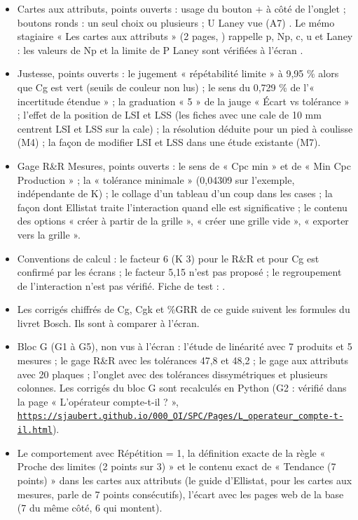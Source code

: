\documentclass[10pt,a4paper]{article}
\begin{document}
\begin{tcolorbox}[verif]
\begin{itemize}
\item Cartes aux attributs, points ouverts : usage du bouton + à côté de l'onglet ; boutons ronds : un seul choix ou plusieurs ; U Laney vue (A7) . Le mémo stagiaire « Les cartes aux attributs » (2 pages, ) rappelle p, Np, c, u et Laney : les valeurs de Np et la limite de P Laney sont vérifiées à l'écran .
\item Justesse, points ouverts : le jugement « répétabilité limite » à 9,95 \% alors que Cg est vert (seuils de couleur non lus) ; le sens du 0,729 \% de l'« incertitude étendue » ; la graduation « 5 » de la jauge « Écart vs tolérance » ; l'effet de la position de LSI et LSS (les fiches avec une cale de 10 mm centrent LSI et LSS sur la cale) ; la résolution déduite pour un pied à coulisse (M4) ; la façon de modifier LSI et LSS dans une étude existante (M7).
\item Gage R\&R Mesures, points ouverts : le sens de « Cpc min » et de « Min Cpc Production » ; la « tolérance minimale » (0,04309 sur l'exemple, indépendante de K) ; le collage d'un tableau d'un coup dans les cases ; la façon dont Ellistat traite l'interaction quand elle est significative ; le contenu des options « créer à partir de la grille », « créer une grille vide », « exporter vers la grille ».
\item Conventions de calcul : le facteur 6 (K 3) pour le R\&R et pour Cg est confirmé par les écrans ; le facteur 5,15 n'est pas proposé ; le regroupement de l'interaction n'est pas vérifié. Fiche de test : .
\item Les corrigés chiffrés de Cg, Cgk et \%GRR de ce guide suivent les formules du livret Bosch. Ils sont à comparer à l'écran.
\item Bloc G (G1 à G5), non vus à l'écran : l'étude de linéarité avec 7 produits et 5 mesures ; le gage R\&R avec les tolérances 47,8 et 48,2 ; le gage aux attributs avec 20 plaques ; l'onglet  avec des tolérances dissymétriques et plusieurs colonnes. Les corrigés du bloc G sont recalculés en Python (G2 : vérifié dans la page « L'opérateur compte-t-il ? », \href{https://sjaubert.github.io/000_OI/SPC/Pages/L_operateur_compte-t-il.html}{\nolinkurl{https://sjaubert.github.io/000_OI/SPC/Pages/L_operateur_compte-t-il.html}}).
\item Le comportement avec Répétition = 1, la définition exacte de la règle « Proche des limites (2 points sur 3) » et le contenu exact de « Tendance (7 points) » dans les cartes aux attributs (le guide d'Ellistat, pour les cartes aux mesures, parle de 7 points consécutifs), l'écart avec les pages web de la base (7 du même côté, 6 qui montent).
\end{itemize}
\end{tcolorbox}
\end{document}
